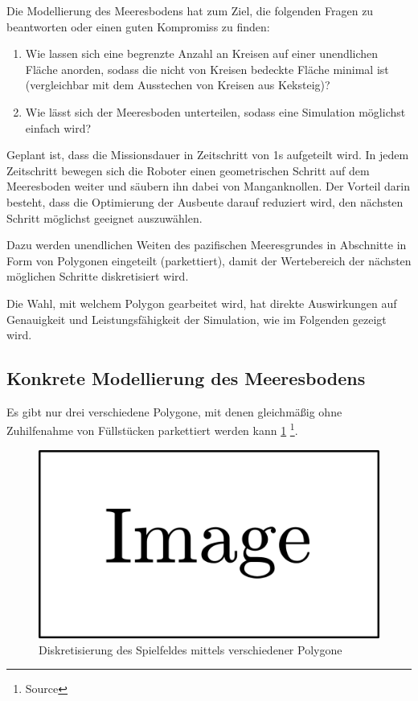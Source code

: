 \documentclass{article}
\begin{document}
Die Modellierung des Meeresbodens hat zum Ziel, die folgenden 
Fragen zu beantworten oder einen guten Kompromiss zu finden:

\begin{enumerate}
\item Wie lassen sich eine begrenzte Anzahl an Kreisen auf einer 
unendlichen Fläche anorden, sodass die nicht von Kreisen bedeckte Fläche minimal 
ist (vergleichbar mit dem Ausstechen von Kreisen aus Keksteig)?
\item Wie lässt sich der Meeresboden unterteilen, sodass eine Simulation
möglichst einfach wird?
\end{enumerate}

Geplant ist, dass die Missionsdauer in Zeitschritt von 1s aufgeteilt wird.
In jedem Zeitschritt bewegen sich die Roboter einen geometrischen Schritt
auf dem Meeresboden weiter und säubern ihn dabei von Manganknollen. Der Vorteil
darin besteht, dass die Optimierung der Ausbeute darauf reduziert wird, 
den nächsten Schritt möglichst geeignet auszuwählen.

Dazu werden unendlichen Weiten des pazifischen Meeresgrundes
in Abschnitte in Form von Polygonen eingeteilt (parkettiert),
damit der Wertebereich der nächsten möglichen Schritte diskretisiert wird.

Die Wahl, mit welchem Polygon gearbeitet wird, hat direkte
Auswirkungen auf Genauigkeit und Leistungsfähigkeit der 
Simulation, wie im Folgenden gezeigt wird.

\subsection{Konkrete Modellierung des Meeresbodens}

Es gibt nur drei verschiedene Polygone, mit denen gleichmäßig
ohne Zuhilfenahme von Füllstücken parkettiert werden kann 
\ref{img:floor_comp_polygons} \footnote{Source}.

\begin{figure}
\includegraphics{img/dummy.png}
\caption{Diskretisierung des Spielfeldes mittels verschiedener Polygone}
\label{img:floor_comp_polygons}
\end{figure}
\end{document}
